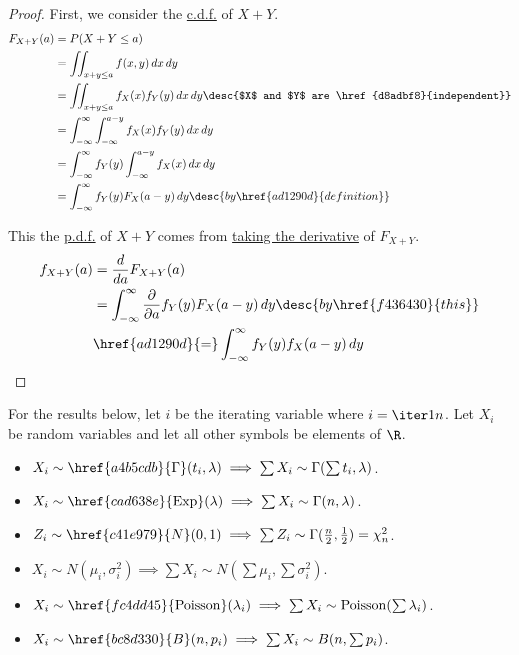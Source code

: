 \begin{proof}
  First, we consider the \href{ad1290d}{c.d.f.} of $X+Y$.
  \begin{align*}
    F_{X+Y}(a) &=P(X+Y\leq a)                                                                            \\
               &=\iint_{x+y\leq a}f(x,y)\,dx\,dy                                                         \\
               &=\iint_{x+y\leq a}f_X(x)f_Y(y)\,dx\,dy\desc{$X$ and $Y$ are \href{d8adbf8}{independent}} \\
               &=\int_{-\infty}^\infty\int_{-\infty}^{a-y}f_X(x)f_Y(y)\,dx\,dy                           \\
               &=\int_{-\infty}^\infty f_Y(y)\int_{-\infty}^{a-y}f_X(x)\,dx\,dy                          \\
               &=\int_{-\infty}^\infty f_Y(y)F_X(a-y)\,dy\desc{by \href{ad1290d}{definition}}
  \end{align*}

  This the \href{cb9d3f0}{p.d.f.} of $X+Y$ comes from \href{ad1290d}{taking the
  derivative} of $F_{X+Y}$.
  \begin{align*}
    f_{X+Y}(a) &=\frac{d}{da}F_{X+Y}(a)                                                                           \\
               &=\int_{-\infty}^\infty\frac{\partial}{\partial a}f_Y(y)F_X(a-y)\,dy\desc{by \href{f436430}{this}} \\
               &\href{ad1290d}{=}\int_{-\infty}^\infty f_Y(y)f_X(a-y)\,dy
  \end{align*}
\end{proof}

\label{d21a6fd}

For the results below, let $i$ be the iterating variable where $i=\iter1n$. Let
$X_i$ be random variables and let all other symbols be elements of $\R$.
\begin{itemize}
  \item $X_i\sim\href{a4b5cdb}{\Gamma}(t_i,\lambda)\implies\sum X_i\sim\Gamma(\sum t_i, \lambda)$.
  \item $X_i\sim\href{cad638e}{\mathrm{Exp}}(\lambda)\implies\sum X_i\sim\Gamma(n,\lambda)$.
  \item $Z_i\sim\href{c41e979}{N}(0,1)\implies\sum Z_i\sim\Gamma(\frac n2,\frac12)=\chi_n^2$.
  \item $X_i\sim N(\mu_i,\sigma_i^2)\implies\sum X_i\sim N(\sum\mu_i,\sum\sigma_i^2)$.
  \item $X_i\sim\href{fc4dd45}{\mathrm{Poisson}}(\lambda_i)\implies\sum X_i\sim\mathrm{Poisson}(\sum\lambda_i)$.
  \item $X_i\sim\href{bc8d330}{B}(n,p_i)\implies\sum X_i\sim B(n,\sum p_i)$.
\end{itemize}
